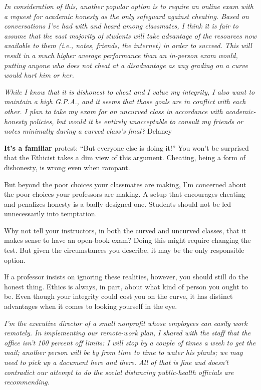 \emph{In consideration of this, another popular option is to require an
online exam with a request for academic honesty as the only safeguard
against cheating. Based on conversations I've had with and heard among
classmates, I think it is fair to assume that the vast majority of
students will take advantage of the resources now available to them
(i.e., notes, friends, the internet) in order to succeed. This will
result in a much higher average performance than an in-person exam
would, putting anyone who does not cheat at a disadvantage as any
grading on a curve would hurt him or her.}

\emph{While I know that it is dishonest to cheat and I value my
integrity, I also want to maintain a high G.P.A., and it seems that
those goals are in conflict with each other. I plan to take my exam for
an uncurved class in accordance with academic-honesty policies, but
would it be entirely unacceptable to consult my friends or notes
minimally during a curved class's final?} Delaney

\textbf{It's a familiar} protest: ``But everyone else is doing it!'' You
won't be surprised that the Ethicist takes a dim view of this argument.
Cheating, being a form of dishonesty, is wrong even when rampant.

But beyond the poor choices your classmates are making, I'm concerned
about the poor choices your professors are making. A setup that
encourages cheating and penalizes honesty is a badly designed one.
Students should not be led unnecessarily into temptation.

Why not tell your instructors, in both the curved and uncurved classes,
that it makes sense to have an open-book exam? Doing this might require
changing the test. But given the circumstances you describe, it may be
the only responsible option.

If a professor insists on ignoring these realities, however, you should
still do the honest thing. Ethics is always, in part, about what kind of
person you ought to be. Even though your integrity could cost you on the
curve, it has distinct advantages when it comes to looking yourself in
the eye.

\emph{I'm the executive director of a small nonprofit whose employees
can easily work remotely. In implementing our remote-work plan, I shared
with the staff that the office isn't 100 percent off limits: I will stop
by a couple of times a week to get the mail; another person will be by
from time to time to water his plants; we may need to pick up a document
here and there. All of that is fine and doesn't contradict our attempt
to do the social distancing public-health officials are recommending.}

